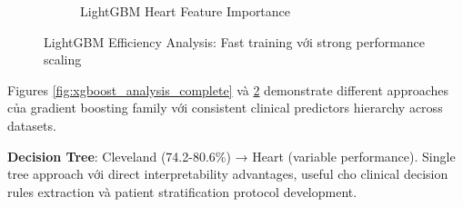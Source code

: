 \begin{figure}[H]
\begin{subfigure}[b]{0.48\textwidth}
\caption{LightGBM Heart Feature Importance}
\label{fig:lightgbm_shap_heart_analysis}
\end{subfigure}
\caption{LightGBM Efficiency Analysis: Fast training với strong performance scaling}
\label{fig:lightgbm_analysis_complete}
\end{figure}

Figures \ref{fig:xgboost_analysis_complete} và \ref{fig:lightgbm_analysis_complete} demonstrate different approaches của gradient boosting family với consistent clinical predictors hierarchy across datasets.

\textbf{Decision Tree}: Cleveland (74.2-80.6\%) → Heart (variable performance). Single tree approach với direct interpretability advantages, useful cho clinical decision rules extraction và patient stratification protocol development.

